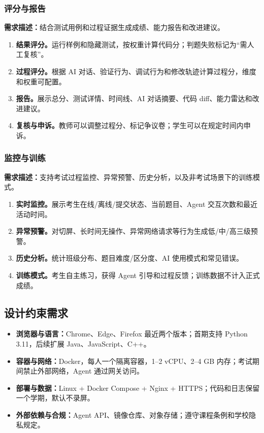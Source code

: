 \documentclass[UTF8,12pt,a4paper]{ctexart}
\begin{document}
\subsubsection{评分与报告}

\textbf{需求描述：}结合测试用例和过程证据生成成绩、能力报告和改进建议。

\begin{enumerate}[leftmargin=2em,itemsep=2pt]
  \item \textbf{结果评分。}运行样例和隐藏测试，按权重计算代码分；判题失败标记为“需人工复核”。
  \item \textbf{过程评分。}根据 AI 对话、验证行为、调试行为和修改轨迹计算过程分，维度和权重可配置。
  \item \textbf{报告。}展示总分、测试详情、时间线、AI 对话摘要、代码 diff、能力雷达和改进建议。
  \item \textbf{复核与申诉。}教师可以调整过程分、标记争议卷；学生可以在规定时间内申诉。
\end{enumerate}

\subsubsection{监控与训练}

\textbf{需求描述：}支持考试过程监控、异常预警、历史分析，以及非考试场景下的训练模式。

\begin{enumerate}[leftmargin=2em,itemsep=2pt]
  \item \textbf{实时监控。}展示考生在线/离线/提交状态、当前题目、Agent 交互次数和最近活动时间。
  \item \textbf{异常预警。}对切屏、长时间无操作、异常网络请求等行为生成低/中/高三级预警。
  \item \textbf{历史分析。}统计班级分布、题目难度/区分度、AI 使用模式和常见错误。
  \item \textbf{训练模式。}考生自主练习，获得 Agent 引导和过程反馈；训练数据不计入正式成绩。
\end{enumerate}

\subsection{设计约束需求}

\begin{itemize}[leftmargin=2em]
  \item \textbf{浏览器与语言：}Chrome、Edge、Firefox 最近两个版本；首期支持 Python 3.11，后续扩展 Java、JavaScript、C++。
  \item \textbf{容器与网络：}Docker，每人一个隔离容器，1--2 vCPU、2--4 GB 内存；考试期间禁止外部网络，Agent 通过网关访问。
  \item \textbf{部署与数据：}Linux + Docker Compose + Nginx + HTTPS；代码和日志保留一个学期，默认不录屏。
  \item \textbf{外部依赖与合规：}Agent API、镜像仓库、对象存储；遵守课程条例和学校隐私规定。
\end{itemize}
\end{document}
